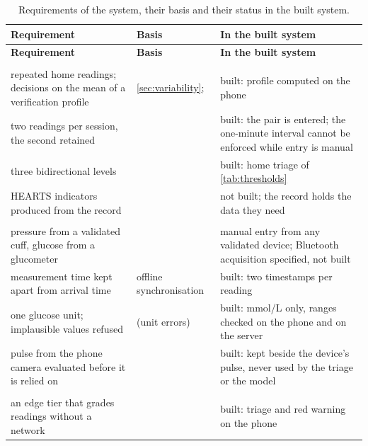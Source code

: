 \documentclass[11pt,a4paper,oneside]{report}
\begin{document}
{\footnotesize
\begin{longtable}{@{}>{\raggedright\arraybackslash}p{4.9cm} >{\raggedright\arraybackslash}p{3.2cm} >{\raggedright\arraybackslash}p{5.5cm}@{}}
\caption{Requirements of the system, their basis and their status in the built system.}\label{tab:requirements}\\
\toprule
\textbf{Requirement} & \textbf{Basis} & \textbf{In the built system} \\
\midrule
\endfirsthead
\toprule
\textbf{Requirement} & \textbf{Basis} & \textbf{In the built system} \\
\midrule
\endhead
\multicolumn{3}{@{}l}{\textit{Measurement}} \\
repeated home readings; decisions on the mean of a verification profile & \cref{sec:variability}; \textcite{mihevc2025} & built: profile computed on the phone \\
two readings per session, the second retained & \textcite{mihevc2025} & built: the pair is entered; the one-minute interval cannot be enforced while entry is manual \\
three bidirectional levels & \textcite{mihevc2025} & built: home triage of \cref{tab:thresholds} \\
HEARTS indicators produced from the record & \textcite{who2023hypertension} & not built; the record holds the data they need \\
\addlinespace
\multicolumn{3}{@{}l}{\textit{Acquisition}} \\
pressure from a validated cuff, glucose from a glucometer & \textcite{who2023hypertension,alhaddad2022} & manual entry from any validated device; Bluetooth acquisition specified, not built \\
measurement time kept apart from arrival time & offline synchronisation & built: two timestamps per reading \\
one glucose unit; implausible values refused & \textcite{liu2025review} (unit errors) & built: mmol/L only, ranges checked on the phone and on the server \\
pulse from the phone camera evaluated before it is relied on & \textcite{liu2025ppg,alessa2019} & built: kept beside the device's pulse, never used by the triage or the model \\
\addlinespace
\multicolumn{3}{@{}l}{\textit{Architecture}} \\
an edge tier that grades readings without a network & \textcite{mucchi2021,segun2025} & built: triage and red warning on the phone \\

\end{longtable}}
\end{document}

